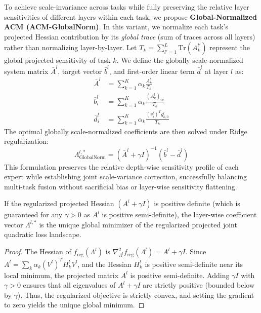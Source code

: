 To achieve scale-invariance across tasks while fully preserving the relative layer sensitivities of different layers within each task, we propose \textbf{Global-Normalized ACM (ACM-GlobalNorm)}. In this variant, we normalize each task's projected Hessian contribution by its \emph{global trace} (sum of traces across all layers) rather than normalizing layer-by-layer. Let $T_k = \sum_{l'=1}^L \text{Tr}(A_k^{l'})$ represent the global projected sensitivity of task $k$. We define the globally scale-normalized system matrix $\bar{A}^l$, target vector $\bar{b}^l$, and first-order linear term $\bar{d}^l$ at layer $l$ as:
\begin{align}
    \bar{A}^l &= \sum_{k=1}^K \alpha_k \frac{A_k^l}{T_k} \\
    \bar{b}^l_i &= \sum_{k=1}^K \alpha_k \frac{(A_k^l)_{ik}}{T_k} \\
    \bar{d}^l_i &= \sum_{k=1}^K \alpha_k \frac{(v_i^l)^T g_{k,0}^l}{T_k}
\end{align}
The optimal globally scale-normalized coefficients are then solved under Ridge regularization:
\begin{equation}
    \Lambda^{l, *}_{\text{GlobalNorm}} = (\bar{A}^l + \gamma I)^{-1} (\bar{b}^l - \bar{d}^l)
\end{equation}
This formulation preserves the relative depth-wise sensitivity profile of each expert while establishing joint scale-variance correction, successfully balancing multi-task fusion without sacrificial bias or layer-wise sensitivity flattening.

\begin{theorem}
    If the regularized projected Hessian $(A^l + \gamma I)$ is positive definite (which is guaranteed for any $\gamma > 0$ as $A^l$ is positive semi-definite), the layer-wise coefficient vector $\Lambda^{l, *}$ is the unique global minimizer of the regularized projected joint quadratic loss landscape.
\end{theorem}
\begin{proof}
    The Hessian of $f_{\text{reg}}(\Lambda^l)$ is $\nabla^2_{\Lambda^l} f_{\text{reg}}(\Lambda^l) = A^l + \gamma I$. Since $A^l = \sum_k \alpha_k (V^l)^T H_k^l V^l$, and the Hessian $H_k^l$ is positive semi-definite near its local minimum, the projected matrix $A^l$ is positive semi-definite. Adding $\gamma I$ with $\gamma > 0$ ensures that all eigenvalues of $A^l + \gamma I$ are strictly positive (bounded below by $\gamma$). Thus, the regularized objective is strictly convex, and setting the gradient to zero yields the unique global minimum.
\end{proof}

